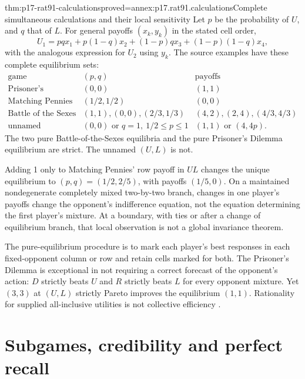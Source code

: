\begin{hbtheorem}{thm:p17-rat91-calculations}{proved=annex:p17.rat91.calculations}{Complete simultaneous calculations and their local sensitivity}
Let \(p\) be the probability of \(U\), and \(q\) that of \(L\).
For general payoffs \((x_k,y_k)\) in the stated cell order,
\[
 U_1=pqx_1+p(1-q)x_2+(1-p)qx_3+(1-p)(1-q)x_4,
\]
with the analogous expression for \(U_2\) using \(y_k\).
The source examples have these complete equilibrium sets:
\[
\begin{array}{c|c|c}
\text{game}&(p,q)&\text{payoffs}\\\hline
\text{Prisoner's Dilemma}&(0,0)&(1,1)\\
\text{Matching Pennies}&(1/2,1/2)&(0,0)\\
\text{Battle of the Sexes}&(1,1),(0,0),(2/3,1/3)&
 (4,2),(2,4),(4/3,4/3)\\
\text{unnamed}&(0,0)\text{ or }q=1,\ 1/2\leq p\leq1&
 (1,1)\text{ or }(4,4p).
\end{array}
\]
The two pure Battle-of-the-Sexes equilibria and the pure Prisoner's
Dilemma equilibrium are strict. The unnamed \((U,L)\) is not.

Adding 1 only to Matching Pennies' row payoff in \(UL\) changes
the unique equilibrium to \((p,q)=(1/2,2/5)\), with payoffs
\((1/5,0)\). On a maintained nondegenerate completely mixed
two-by-two branch, changes in one player's payoffs change the
opponent's indifference equation, not the equation determining the
first player's mixture. At a boundary, with ties or after a change
of equilibrium branch, that local observation is not a global
invariance theorem.
\end{hbtheorem}

The pure-equilibrium procedure is to mark each player's best responses
in each fixed-opponent column or row and retain cells marked for both.
The Prisoner's Dilemma is exceptional in not requiring a correct forecast
of the opponent's action: \(D\) strictly beats \(U\) and \(R\)
strictly beats \(L\) for every opponent mixture. Yet \((3,3)\)
at \((U,L)\) strictly Pareto improves the equilibrium \((1,1)\).
Rationality for supplied all-inclusive utilities is not collective
efficiency \parencite[pp.~532--533]{AlbertKliemt2021ClassicalGameTheory}.

\section{Subgames, credibility and perfect recall}

